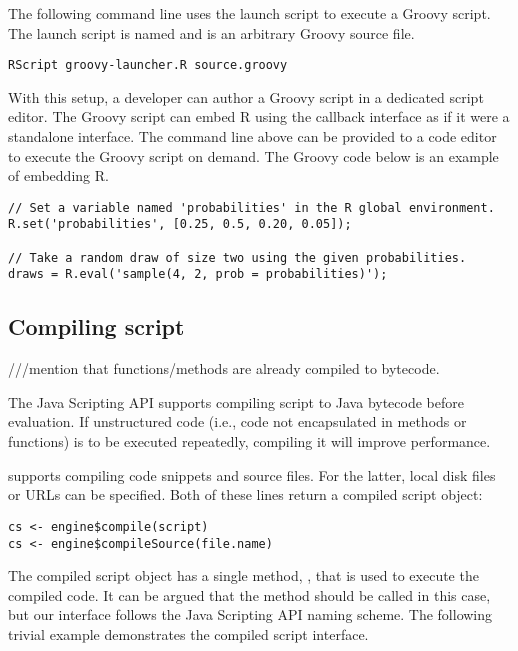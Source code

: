 The following command line uses the launch script to execute a Groovy script. The launch script is named  and  is an arbitrary Groovy source file.

\begin{verbatim}
RScript groovy-launcher.R source.groovy
\end{verbatim}

With this setup, a developer can author a Groovy script in a dedicated script editor. The Groovy script can embed R using the  callback interface as if it were a standalone interface. The command line above can be provided to a code editor to execute the Groovy script on demand. The Groovy code below is an example of embedding R.

\begin{verbatim}
// Set a variable named 'probabilities' in the R global environment.
R.set('probabilities', [0.25, 0.5, 0.20, 0.05]);

// Take a random draw of size two using the given probabilities.
draws = R.eval('sample(4, 2, prob = probabilities)');
\end{verbatim}

\subsection{Compiling script}

///mention that functions/methods are already compiled to bytecode.

The Java Scripting API supports compiling script to Java bytecode before evaluation. If unstructured code (i.e., code not encapsulated in methods or functions) is to be executed repeatedly, compiling it will improve performance.

 supports compiling code snippets and source files. For the latter, local disk files or URLs can be specified. Both of these lines return a compiled script object:

\begin{verbatim}
cs <- engine$compile(script)
cs <- engine$compileSource(file.name)
\end{verbatim}

The compiled script object has a single method, , that is used to execute the compiled code. It can be argued that the method should be called  in this case, but our interface follows the Java Scripting API naming scheme. The following trivial example demonstrates the compiled script interface.

